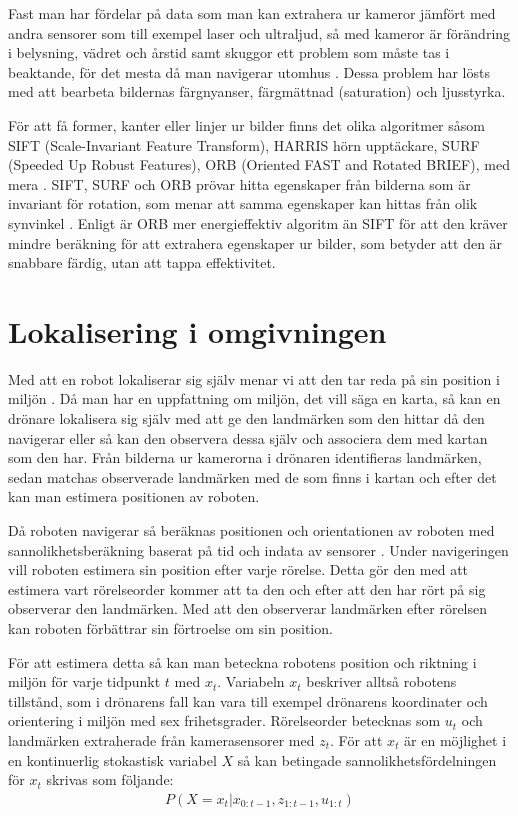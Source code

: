 Fast man har fördelar på data som man kan extrahera ur kameror jämfört med andra sensorer som till exempel laser och ultraljud, så med kameror är förändring i belysning, vädret och årstid samt skuggor ett problem som måste tas i beaktande, för det mesta då man navigerar utomhus \citep{982903}. Dessa problem har lösts med att bearbeta bildernas färgnyanser, färgmättnad (saturation) och ljusstyrka.

För att få former, kanter eller linjer ur bilder finns det olika algoritmer såsom SIFT (Scale-Invariant Feature Transform), HARRIS hörn upptäckare, SURF (Speeded Up Robust Features), ORB (Oriented FAST and Rotated BRIEF), med mera \citep{orb, slamproblem, mapbuildingsift}. SIFT, SURF och ORB prövar hitta egenskaper från bilderna som är invariant för rotation, som menar att samma egenskaper kan hittas från olik synvinkel \citep{orb}. Enligt \cite{orb} är ORB mer energieffektiv algoritm än SIFT för att den kräver mindre beräkning för att extrahera egenskaper ur bilder, som betyder att den är snabbare färdig, utan att tappa effektivitet.

\section{Lokalisering i omgivningen}

Med att en robot lokaliserar sig själv menar vi att den tar reda på sin position i miljön \citep{982903}. Då man har en uppfattning om miljön, det vill säga en karta, så kan en drönare lokalisera sig själv med att ge den landmärken som den hittar då den navigerar eller så kan den observera dessa själv och associera dem med kartan som den har. Från bilderna ur kamerorna i drönaren identifieras landmärken, sedan matchas observerade landmärken med de som finns i kartan och efter det kan man estimera positionen av roboten.

Då roboten navigerar så beräknas positionen och orientationen av roboten med sannolikhetsberäkning baserat på tid och indata av sensorer \citep{ProbabilisticRobotics}. Under navigeringen vill roboten estimera sin position efter varje rörelse. Detta gör den med att estimera vart rörelseorder kommer att ta den och efter att den har rört på sig observerar den landmärken. Med att den observerar landmärken efter rörelsen kan roboten förbättrar sin förtroelse om sin position. 

För att estimera detta så kan man beteckna robotens position och riktning i miljön för varje tidpunkt $t$ med $x_t$. Variabeln $x_t$ beskriver alltså robotens tillstånd, som i drönarens fall kan vara till exempel drönarens koordinater och orientering i miljön med sex frihetsgrader. Rörelseorder betecknas som $u_t$ och landmärken extraherade från kamerasensorer med $z_t$. För att $x_t$ är en möjlighet i en kontinuerlig stokastisk variabel $X$ så kan betingade sannolikhetsfördelningen för $x_t$ skrivas som följande:
\begin{align}
    P( X = x_t | x_{0:t-1}, z_{1:t-1}, u_{1:t})
\end{align}

